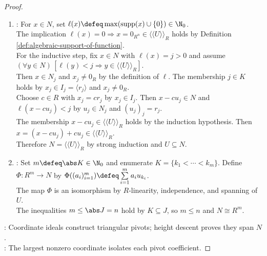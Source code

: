 \begin{theorem}
\begin{proof}
\begin{enumerate}[label=(\roman*)]
The equality $c_jr_j=0_R$ holds in coordinate $j$ by $c_k=0_R$ for $k>j$ and $(u_k)_j=0_R$ for $k<j$.\\
Then $c_j=0_R$ by Proposition \ref{prop:integral-domain-cancellation}, $r_j\neq0_R$, contrary to $j\in C$; $C=\emptyset$, so $U$ is $R$-linearly independent by Definition \ref{def:module-linear-independence}.
\item {}: For $x\in N$, set $\ell(x)\defeq\max(\operatorname{supp}(x)\cup\{0\})\in\N_0$.\\
The implication $\ell(x)=0\Rightarrow x=0_{R^n}\in\langle\!\langle U\rangle\!\rangle_R$ holds by Definition \ref{def:algebraic-support-of-function}.\\
For the inductive step, fix $x\in N$ with $\ell(x)=j>0$ and assume $(\forall y\in N)\,[\ell(y)<j\Rightarrow y\in\langle\!\langle U\rangle\!\rangle_R]$.\\
Then $x\in N_j$ and $x_j\neq0_R$ by the definition of $\ell$. The membership $j\in K$ holds by $x_j\in I_j=\langle r_j\rangle$ and $x_j\neq0_R$.\\
Choose $c\in R$ with $x_j=cr_j$ by $x_j\in I_j$. Then $x-cu_j\in N$ and $\ell(x-cu_j)<j$ by $u_j\in N_j$ and $(u_j)_j=r_j$.\\
The membership $x-cu_j\in\langle\!\langle U\rangle\!\rangle_R$ holds by the induction hypothesis. Then $x=(x-cu_j)+cu_j\in\langle\!\langle U\rangle\!\rangle_R$.\\
Therefore $N=\langle\!\langle U\rangle\!\rangle_R$ by strong induction and $U\subseteq N$.
\item {}: Set $m\defeq\abs K\in\N_0$ and enumerate $K=\{k_1<\cdots<k_m\}$. Define $\Phi:R^m\to N$ by $\Phi((a_i)_{i=1}^m)\defeq\sum\limits_{i=1}^ma_iu_{k_i}$.\\
The map $\Phi$ is an isomorphism by $R$-linearity, independence, and spanning of $U$.\\
The inequalities $m\leq\abs J=n$ hold by $K\subseteq J$, so $m\leq n$ and $N\cong R^m$.
\end{enumerate}
: Coordinate ideals construct triangular pivots; height descent proves they span $N$.\\
: The largest nonzero coordinate isolates each pivot coefficient.
\end{proof}
\end{theorem}

